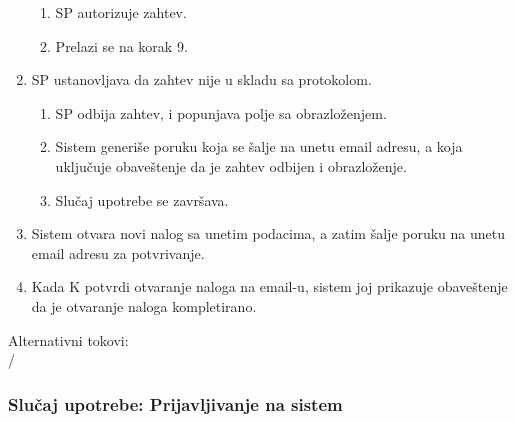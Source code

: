 \begin{enumerate}
	\begin{enumerate}
		\item SP autorizuje zahtev.
		\item Prelazi se na korak 9.
	\end{enumerate}
	\item SP ustanovljava da zahtev nije u skladu sa protokolom.
	\begin{enumerate}
		\item SP odbija zahtev, i popunjava polje sa obrazlo\v zenjem.
		\item Sistem generi\v se poruku koja se \v salje na unetu email adresu, a koja uklju\v cuje obave\v stenje da je zahtev odbijen i obrazlo\v zenje.
		\item Slu\v caj upotrebe se zavr\v sava.
	\end{enumerate}
	\item Sistem otvara novi nalog sa unetim podacima, a zatim \v salje poruku na unetu email adresu za potvr\dj ivanje.
	\item Kada K potvrdi otvaranje naloga na email-u, sistem joj prikazuje obave\v stenje da je otvaranje naloga kompletirano.
\end{enumerate}

\noindent Alternativni tokovi: 
\\/

\subsubsection{Slu\v caj upotrebe: Prijavljivanje na sistem}
\label{su: prijavljivanje na sistem}

